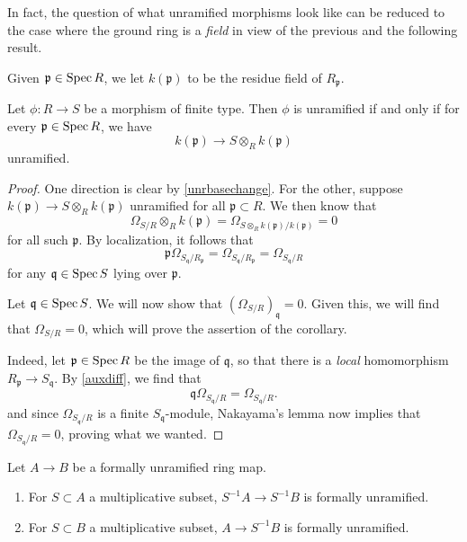 In fact, the question of what unramified morphisms look like can be reduced to
the case where the ground ring is a \emph{field} in view of the previous and
the following result.

Given $\mathfrak{p} \in \operatorname{Spec} R$, we let $k(\mathfrak{p})$ to be the residue
field of $R_{\mathfrak{p}}$.


\begin{corollary} \label{reduceunrtofield} 
Let $\phi: R \to S$ be a morphism of finite type. Then $\phi$ is unramified if
and only if for every $\mathfrak{p} \in \operatorname{Spec} R$, we have
\[ k(\mathfrak{p}) \to S \otimes_R k(\mathfrak{p})  \]
unramified.
\end{corollary} 
\begin{proof} 
One direction is clear by \cref{unrbasechange}. For the other, suppose
$k(\mathfrak{p}) \to S \otimes_R k(\mathfrak{p})$ unramified for all $\mathfrak{p} \subset R$.
We then know that 
\[ \Omega_{S/R} \otimes_R k(\mathfrak{p}) = \Omega_{S \otimes_R
k(\mathfrak{p})/k(\mathfrak{p})} = 0  \]
for all such $\mathfrak{p}$. By localization, it follows that
\begin{equation} \label{auxdiff} \mathfrak{p}
\Omega_{S_{\mathfrak{q}}/R_{\mathfrak{p}}} =
\Omega_{S_{\mathfrak{q}}/R_{\mathfrak{p}}} = \Omega_{S_{\mathfrak{q}}/R}  \end{equation}
for any $\mathfrak{q} \in \operatorname{Spec} S$ lying over $\mathfrak{p}$.

Let $\mathfrak{q} \in \operatorname{Spec} S$. We will now show that
$(\Omega_{S/R})_{\mathfrak{q}} = 0$. 
Given this, we will find that $\Omega_{S/R} =0$, which will prove the
assertion of the corollary. 


Indeed, let $\mathfrak{p} \in \operatorname{Spec} R$ be
the image of $\mathfrak{q}$, so that there is a \emph{local} homomorphism 
$R_{\mathfrak{p}} \to S_{\mathfrak{q}}$. By \cref{auxdiff}, we find that
\[ \mathfrak{q} \Omega_{S_{\mathfrak{q}}/R} = \Omega_{S_{\mathfrak{q}}/R}.  \]
and since $\Omega_{S_{\mathfrak{q}}/R}$ is a finite $S_{\mathfrak{q}}$-module,
Nakayama's lemma now implies that $\Omega_{S_{\mathfrak{q}}/R}=0$, proving
what we wanted. 
\end{proof} 


\begin{lemma}
\label{lemma-formally-unramified-localize}
Let $A \to B$ be a formally unramified ring map.
\begin{enumerate}
\item For $S \subset A$ a multiplicative subset,
$S^{-1}A \to S^{-1}B$ is formally unramified.
\item For $S \subset B$ a multiplicative subset,
$A \to S^{-1}B$ is formally unramified.
\end{enumerate}
\end{lemma}

